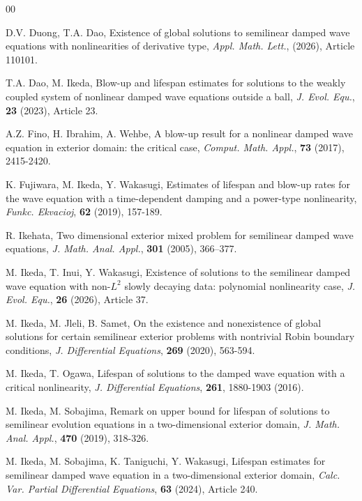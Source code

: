 \documentclass[a4paper,11pt]{article} %
\theoremstyle{remark}
\theoremstyle{definition}
\numberwithin{equation}{section}
\begin{document}
\begin{thebibliography}{00}


 D.V. Duong, T.A. Dao, Existence of global solutions to semilinear damped wave equations with nonlinearities of derivative type, \textit{Appl. Math. Lett.}, (2026), Article 110101.

 T.A. Dao, M. Ikeda, Blow-up and lifespan estimates for solutions to the weakly coupled system of nonlinear damped wave equations outside a ball, \textit{J. Evol. Equ.}, \textbf{23} (2023), Article 23.

 A.Z. Fino, H. Ibrahim, A. Wehbe, A blow-up result for a nonlinear damped wave equation in exterior domain: the critical case, \textit{Comput. Math. Appl.}, \textbf{73} (2017), 2415-2420.

 K. Fujiwara, M. Ikeda, Y. Wakasugi, Estimates of lifespan and blow-up rates for the wave equation with a time-dependent damping and a power-type nonlinearity, \textit{Funkc. Ekvacioj}, \textbf{62} (2019), 157-189.

 R. Ikehata, Two dimensional exterior mixed problem for semilinear damped wave equations, \textit{J. Math. Anal. Appl.}, \textbf{301} (2005), 366–377.

 M. Ikeda, T. Inui, Y. Wakasugi, Existence of solutions to the semilinear damped wave equation with non-\(L^2\) slowly decaying data: polynomial nonlinearity case, \textit{J. Evol. Equ.}, \textbf{26} (2026), Article 37.

 M. Ikeda, M. Jleli, B. Samet, On the existence and nonexistence of global solutions for certain semilinear exterior problems with nontrivial Robin boundary conditions, \textit{J. Differential Equations}, \textbf{269} (2020), 563-594.

 M. Ikeda, T. Ogawa, Lifespan of solutions to the damped wave equation with a critical nonlinearity, \textit{J. Differential Equations}, \textbf{261}, 1880-1903 (2016).

 M. Ikeda, M. Sobajima, Remark on upper bound for lifespan of solutions to semilinear evolution equations in a two-dimensional exterior domain, \textit{J. Math. Anal. Appl.}, \textbf{470} (2019), 318-326.

 M. Ikeda, M. Sobajima, K. Taniguchi, Y. Wakasugi, Lifespan estimates for semilinear damped wave equation in a two-dimensional exterior domain, \textit{Calc. Var. Partial Differential Equations}, \textbf{63} (2024), Article 240.


\end{thebibliography}
\end{document}

